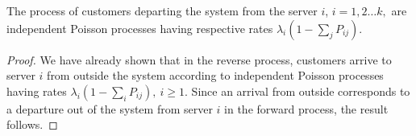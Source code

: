 \documentclass[a4paper,10pt,english]{article}
\begin{document}
\begin{cor}
The process of customers departing the system from the server $i$, $i=1,2 \hdots k,$ are independent Poisson processes having respective rates $\lambda_i (1-\sum_j P_{ij} )$.
\end{cor}
\begin{proof}
We have already shown that in the reverse process, customers arrive to server $i$ from outside the system according to independent Poisson processes having rates $\lambda_i(1-\sum_{i}P_{ij}),~ i \geq 1$. Since an arrival from outside corresponds to a departure out of the system from server $i$ in the forward process, the result follows. 
\end{proof}
\end{document}
